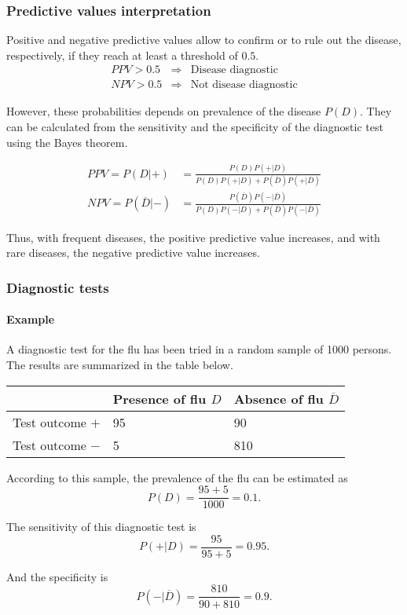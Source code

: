 \begin{frame}
\frametitle{Predictive values interpretation}
Positive and negative predictive values allow to confirm or to rule out the disease, respectively, if they reach at least a threshold of $0.5$.
\[
\begin{array}{rcl}
PPV>0.5 & \Rightarrow & \mbox{Disease diagnostic}\\
NPV>0.5 & \Rightarrow & \mbox{Not disease diagnostic} 
\end{array}
\]

However, these probabilities depends on prevalence of the disease $P(D)$.
They can be calculated from the sensitivity and the specificity of the diagnostic test using the Bayes theorem.

\begin{align*}
PPV=P(D|+) &= \frac{P(D)P(+|D)}{P(D)P(+|D)+P(\overline{D})P(+|\overline{D})}\\
NPV=P(\overline{D}|-) &= \frac{P(\overline{D})P(-|\overline{D})}{P(D)P(-|D)+P(\overline{D})P(-|\overline{D})}
\end{align*}

Thus, with frequent diseases, the positive predictive value increases, and with rare diseases, the negative predictive value increases. 
\end{frame}


\begin{frame}
\frametitle{Diagnostic tests}
\framesubtitle{Example}
A diagnostic test for the flu has been tried in a random sample of 1000 persons.
The results are summarized in the table below.
\begin{center}
\begin{tabular}{|m{2.5cm}|m{3cm}<{\centering}|m{3cm}<{\centering}|}
\cline{2-3}
\multicolumn{1}{c|}{} & Presence of flu $D$ & Absence of flu $\overline D$\\ \hline
Test outcome $+$ & 95 & 90 \\
\hline
Test outcome $-$ & 5 & 810 \\
\hline
\end{tabular}
\end{center}

According to this sample, the prevalence of the flu can be estimated as
\[
P(D) = \frac{95+5}{1000} = 0.1.
\] 

The sensitivity of this diagnostic test is
\[
P(+|D) = \frac{95}{95+5}= 0.95. 
\] 

And the specificity is 
\[
P(-|\overline{D}) = \frac{810}{90+810}=0.9.
\]
\end{frame}


